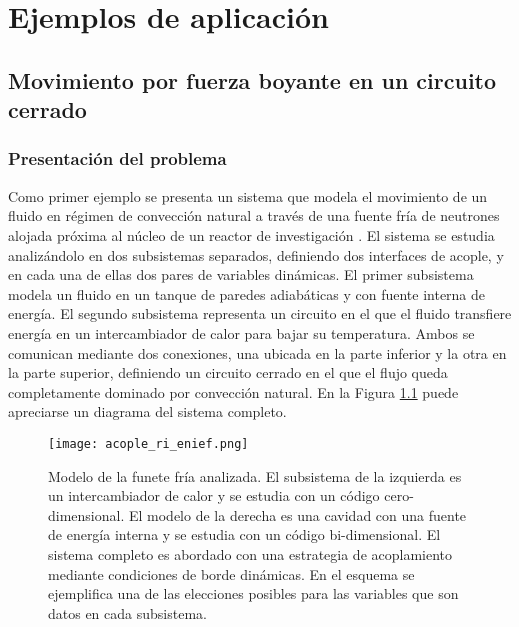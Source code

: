 \chapter{Ejemplos de aplicación}
\label{chap3}

\section{Movimiento por fuerza boyante en un circuito cerrado}
\label{3:ff}

\subsection*{Presentación del problema}
Como primer ejemplo se presenta un sistema que modela el movimiento de un fluido en régimen de convección natural a través de
una fuente fría de neutrones alojada próxima al núcleo de un reactor de investigación \cite{fuente-fria}.
El sistema se estudia analizándolo en dos subsistemas separados,
definiendo dos interfaces de acople,
y en cada una de ellas dos pares de variables dinámicas.
El primer subsistema modela un fluido en un tanque de paredes adiabáticas y con fuente interna de energía. 
El segundo subsistema representa un circuito en el que el fluido transfiere energía en un intercambiador de calor para bajar su temperatura.
Ambos se comunican mediante dos conexiones, una ubicada en la parte inferior y la otra en la parte superior,
definiendo un circuito cerrado en el que el flujo queda completamente dominado por convección natural.
En la Figura \ref{esquemaFuenteFria} puede apreciarse un diagrama del sistema completo.

\begin{figure}[ht]
\centering{}\texttt{[image: acople\_ri\_enief.png]}
\caption[Modelo de la fuente fría compuesto por un subsistemas cero-dimensional y otro subsistema bi-dimensional.]
{Modelo de la funete fría analizada. 
El subsistema de la izquierda es un intercambiador de calor y se estudia con un código cero-dimensional.
El modelo de la derecha es una cavidad con una fuente de energía interna y se estudia con un código bi-dimensional.
El sistema completo es abordado con una estrategia de acoplamiento mediante condiciones de borde dinámicas.
En el esquema se ejemplifica una de las elecciones posibles para las variables que son datos en cada subsistema.}
\label{esquemaFuenteFria}
\end{figure}


